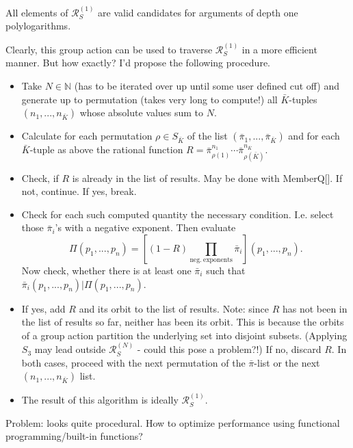 \documentclass[10pt]{article}
\newcommand*{\IN}{\mathbb{N}}
\newcommand*{\rff}{\mathcal{R}}
\begin{document}
\begin{itemize}
\begin{itemize}
All elements of $\rff_S^{(1)}$ are valid candidates for arguments of depth one polylogarithms.

Clearly, this group action can be used to traverse $\rff_S^{(1)}$ in a more efficient manner. But how exactly? I'd propose the following procedure.
\begin{itemize}
\item Take $N \in \IN$ (has to be iterated over up until some user defined cut off) and generate up to permutation (takes very long to compute!) all $\bar K$-tuples $(n_1, ..., n_{\bar K})$ whose absolute values sum to $N$.
\item Calculate for each permutation $\rho \in S_{\bar K}$ of the list $(\bar \pi_1, ..., \bar \pi_{\bar K})$ and for each $\bar K$-tuple as above the rational function $R = \bar \pi_{\rho(1)}^{n_1} \cdots \bar \pi_{\rho(\bar K)}^{n_{\bar K}}$.
\item Check, if $R$ is already in the list of results. May be done with MemberQ[]. If not, continue. If yes, break.
\item Check for each such computed quantity the necessary condition. I.e. select those $\bar \pi_i$'s with a negative exponent. Then evaluate
\begin{equation*}
\Pi(p_1, ..., p_n) = \left[ (1 - R) \prod_{\mathrm{neg. \ exponents}} \bar \pi_i \right](p_1, ..., p_n).
\end{equation*}
Now check, whether there is at least one $\bar \pi_i$ such that $\bar \pi_i(p_1, ..., p_n)|\Pi(p_1, ..., p_n)$.
\item If yes, add $R$ and its orbit to the list of results. Note: since $R$ has not been in the list of results so far, neither has been its orbit. This is because the orbits of a group action partition the underlying set into disjoint subsets. (Applying $S_3$ may lead outside $\rff_S^{(N)}$ - could this pose a problem?!) If no, discard $R$. In both cases, proceed with the next permutation of the $\bar \pi$-list or the next $(n_1, ..., n_{\bar K})$ list.
\item The result of this algorithm is ideally $\rff_S^{(1)}$.
\end{itemize}
Problem: looks quite procedural. How to optimize performance using functional programming/built-in functions?


\end{itemize}
\end{itemize}
\end{document}
